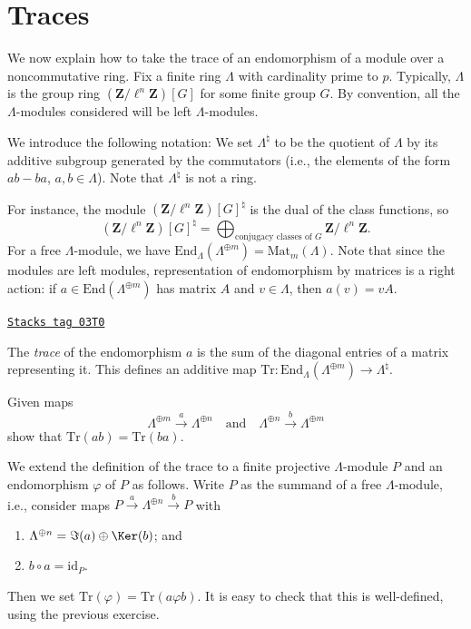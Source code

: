 \section{Traces}
\label{trace-section-traces}
We now explain how to take the trace of an endomorphism of a module over a
noncommutative ring. Fix a finite ring $\Lambda$ with cardinality prime to $p$.
Typically, $\Lambda$ is the group ring $(\mathbf{Z}/\ell^n\mathbf{Z})[G]$ for
some finite group $G$. By convention, all the $\Lambda$-modules considered will
be left $\Lambda$-modules.

\medskip\noindent
We introduce the following notation:
We set $\Lambda^\natural$ to be the quotient of $\Lambda$ by its additive
subgroup generated by the commutators (i.e., the elements of the form
$ab-ba$, $a, b \in \Lambda$). Note that $\Lambda^\natural$ is not a ring.

\medskip\noindent
For instance, the module $(\mathbf{Z}/\ell^n\mathbf{Z})[G]^\natural$ is the
dual of the class functions, so
$$
(\mathbf{Z}/\ell^n\mathbf{Z})[G]^\natural
=
\bigoplus\nolimits_{\text{conjugacy classes of }G}
\mathbf{Z}/\ell^n\mathbf{Z}.
$$
For a free $\Lambda$-module, we have $\text{End}_\Lambda(\Lambda^{\oplus m}) =
\text{Mat}_m(\Lambda)$. Note that since the modules are left modules,
representation of endomorphism by matrices is a right action: if $a \in
\text{End}(\Lambda^{\oplus m})$ has matrix $A$ and $v \in \Lambda$, then $a(v)
= v A$.

\begin{definition}[Trace]
\label{trace-definition-trace}
\href{https://stacks.math.columbia.edu/tag/03T0}{\texttt{Stacks tag 03T0}}

The {\it trace} of the endomorphism $a$ is the sum of the diagonal entries of
a matrix representing it. This defines an additive map $\text{Tr} :
\text{End}_\Lambda(\Lambda^{\oplus m}) \to \Lambda^\natural$.
\end{definition}

\begin{exercise}
\label{exercise-trace-is-trace}
Given maps
$$
\Lambda^{\oplus m} \xrightarrow{a} \Lambda^{\oplus n}
\quad\text{and}\quad
\Lambda^{\oplus n} \xrightarrow{b} \Lambda^{\oplus m}
$$
show that $\text{Tr}(ab) = \text{Tr}(ba)$.
\end{exercise}

We extend the definition of the trace to a finite projective $\Lambda$-module
$P$ and an endomorphism $\varphi$ of $P$ as follows. Write $P$ as the summand
of a free $\Lambda$-module, i.e., consider maps $P \xrightarrow{a}
\Lambda^{\oplus n} \xrightarrow{b} P$ with
\begin{enumerate}
\item
$\Lambda^{\oplus n} = \Im(a) \oplus \Ker(b)$; and
\item
$b\circ a = \text{id}_P$.
\end{enumerate}
Then we set $\text{Tr}(\varphi) = \text{Tr}(a\varphi b)$. It is easy to check
that this is well-defined, using the previous exercise.

